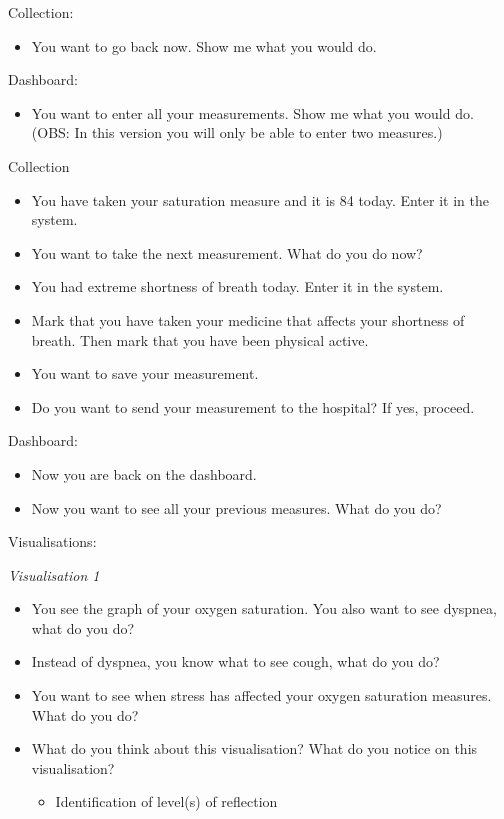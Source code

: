 Collection: 
\begin{itemize}
\item You want to go back now. Show me what you would do.
\end{itemize}

Dashboard:
\begin{itemize}
\item You want to enter all your measurements. Show me what you would do. (OBS: In this version you will only be able to enter two measures.)
\end{itemize}

Collection
\begin{itemize}
\item You have taken your saturation measure and it is 84 today. Enter it in the system.
\item You want to take the next measurement. What do you do now?
\item You had extreme shortness of breath today. Enter it in the system.
\item Mark that you have taken your medicine that affects your shortness of breath. Then mark that you have been physical active.
\item You want to save your measurement.
\item Do you want to send your measurement to the hospital? If yes, proceed.
\end{itemize}

Dashboard:
\begin{itemize}
\item Now you are back on the dashboard.
\item Now you want to see all your previous measures. What do you do?
\end{itemize}

Visualisations:

\textit{\small Visualisation 1}
\begin{itemize}
\item You see the graph of your oxygen saturation. You also want to see dyspnea, what do you do?
\item Instead of dyspnea, you know what to see cough, what do you do?
\item You want to see when stress has affected your oxygen saturation measures. What do you do?
\item What do you think about this visualisation? What do you notice on this visualisation?
\begin{itemize}
 \item Identification of level(s) of reflection
 \end{itemize}
\end{itemize}



